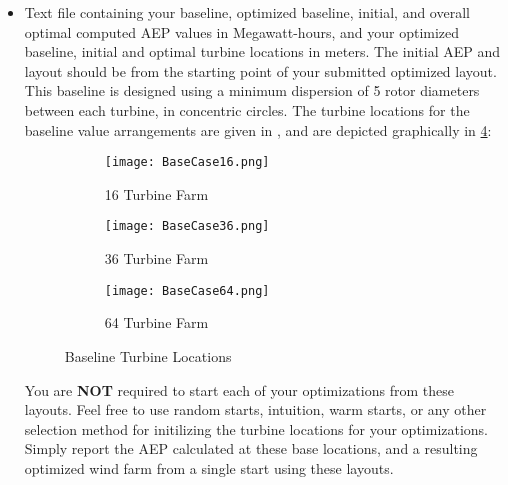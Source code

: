 \documentclass[12pt]{article}
\begin{document}
\begin{itemize}
	\item Text file containing your baseline, optimized baseline, initial, and overall optimal computed AEP values in Megawatt-hours, and your optimized baseline, initial and optimal turbine locations in meters. The initial AEP and layout should be from the starting point of your submitted optimized layout. This baseline is designed using a minimum dispersion of 5 rotor diameters between each turbine, in concentric circles. The turbine locations for the baseline value arrangements are given in , and are depicted graphically in \cref{fig:BaseLoc}: 

\begin{figure}[H]
\centering
    \hspace*{-2.1 cm}
    \begin{subfigure}{.33\paperwidth}
      \centering
      \texttt{[image: BaseCase16.png]}
      \caption{16 Turbine Farm}
      \label{fig:Base16}
    \end{subfigure}%
    \begin{subfigure}{.33\paperwidth}
      \centering
      \texttt{[image: BaseCase36.png]}
      \caption{36 Turbine Farm}
      \label{fig:Base36}
    \end{subfigure}%
    \begin{subfigure}{.33\paperwidth}
      \centering
      \texttt{[image: BaseCase64.png]}
      \caption{64 Turbine Farm}
      \label{fig:Base64}
    \end{subfigure}
    \caption{Baseline Turbine Locations}
    \label{fig:BaseLoc}
\end{figure}    

    You are \textbf{NOT} required to start each of your optimizations from these layouts. Feel free to use random starts, intuition, warm starts, or any other selection method for initilizing the turbine locations for your optimizations. Simply report the AEP calculated at these base locations, and a resulting optimized wind farm from a single start using these layouts.
    

\end{itemize}
\end{document}
